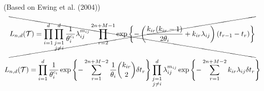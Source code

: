 (Based on Ewing et al. (2004))
\begin{equation}
	\xcancel{
		L_{n,d}(\mathcal{T}) = \prod_{i=1}^d \prod_{\substack{j=1 \\ j \neq i}}^d \frac{1}{\theta_i^{c_i}} \lambda_{ij}^{m_{ij}} \prod_{r=2}^{2n + M -1} \exp \left\{ - \left( \frac{k_{i r} (k_{i r} - 1)}{2 \theta_i} + k_{i r} \lambda_{i j} \right)(t_{r-1} - t_r) \right\}
	}
\end{equation}

\begin{equation}
	L_{n,d}(\mathcal{T}) = \prod_{i=1}^d \frac{1}{\theta_i^{c_i}} \exp \left\{ -\sum_{r=1}^{2n+M-2} \frac{1}{\theta_i} \binom{k_{ir}}{2} \delta t_r \right\} \prod_{\substack{j=1 \\ j \neq i}}^d \lambda_{ij}^{m_{ij}} \exp \left\{ - \sum_{r=1}^{2n + M - 2} k_{ir} \lambda_{ij} \delta t_r \right\}
\end{equation}